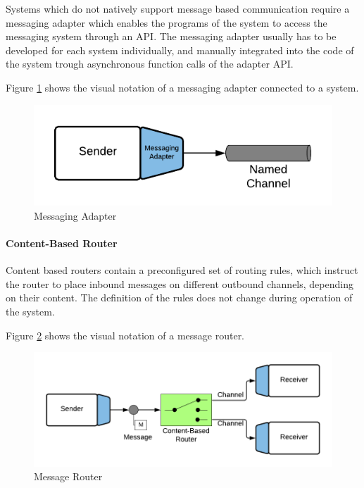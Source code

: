 Systems which do not natively support message based communication require a messaging adapter which enables the programs of the system to access the messaging system through an API. The messaging adapter usually has to be developed for each system individually, and manually integrated into the code of the system trough asynchronous function calls of the adapter API.

Figure \ref{messaging:adapter} shows the visual notation of a messaging adapter connected to a system.

\begin{figure}[H]
    \centering
    \includegraphics[scale=0.6]{Diagrams/Messaging/4. Messaging Adapter.pdf}
    \caption{Messaging Adapter}
    \label{messaging:adapter}
\end{figure}

\paragraph{Content-Based Router}

Content based routers contain a preconfigured set of routing rules, which instruct the router to place inbound messages on different outbound channels, depending on their content. The definition of the rules does not change during operation of the system.

Figure \ref{messaging:router} shows the visual notation of a message router.

\begin{figure}[H]
    \centering
    \includegraphics[scale=0.6]{Diagrams/Messaging/5. Message Router.pdf}
    \caption{Message Router}
    \label{messaging:router}
\end{figure}

